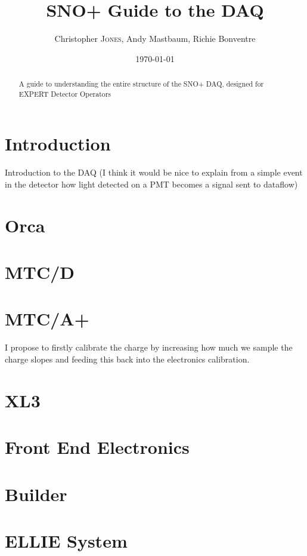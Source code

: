 \documentclass[12pt,preprint]{article}
\title{SNO+ Guide to the DAQ} %
\author{Christopher \textsc{Jones}, Andy Mastbaum, Richie Bonventre} %
\date{\today} %
\begin{document}
\maketitle %

\begin{abstract}
\noindent
A guide to understanding the entire structure of the SNO+ DAQ, designed for EXPERT Detector Operators 
\end{abstract}

\section{Introduction}\normalsize
Introduction to the DAQ (I think it would be nice to explain from a simple event in the detector how light detected on a PMT becomes a signal sent to dataflow)

\section{Orca}


\section{MTC/D}


\section{MTC/A+}
I propose to firstly calibrate the charge by increasing how much we sample the charge slopes and feeding this back into the electronics calibration. 

\section{XL3}

\section{Front End Electronics}



\section{Builder}

\section{ELLIE System}
\end{document}
